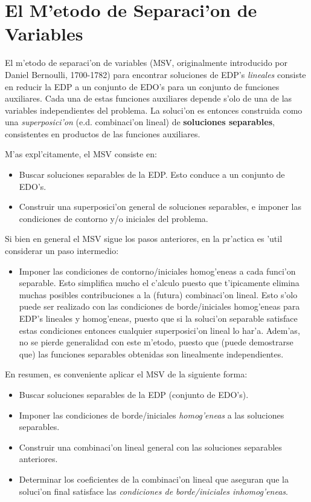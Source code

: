 \chapter{El M'etodo de Separaci'on de Variables}

El m'etodo de separaci'on de variables (MSV, originalmente introducido por Daniel Bernoulli, 1700-1782) para encontrar soluciones de EDP's \textit{lineales} consiste en reducir la EDP a un conjunto de EDO's para un conjunto de funciones auxiliares. Cada una de estas funciones auxiliares depende s'olo de una de las variables independientes del problema. La soluci'on es entonces construida como una \textit{superposici'on} (e.d. combinaci'on lineal) de \textbf{soluciones separables}, consistentes en productos de las funciones auxiliares.

M'as expl'citamente, el MSV consiste en:
\begin{itemize}
\item Buscar soluciones separables de la EDP. Esto conduce a un conjunto de EDO's.
\item Construir una superposici'on general de soluciones separables, e imponer las condiciones de contorno y/o iniciales del problema.
\end{itemize}

Si bien en general el MSV sigue los pasos anteriores, en la pr'actica es 'util considerar un paso intermedio:
\begin{itemize}
\item Imponer las condiciones de contorno/iniciales homog'eneas a cada funci'on separable. Esto simplifica mucho el c'alculo puesto que t'ipicamente elimina muchas posibles contribuciones a la (futura) combinaci'on lineal. Esto s'olo puede ser realizado con las condiciones de borde/iniciales homog'eneas para EDP's lineales y homog'eneas, puesto que si la soluci'on separable satisface estas condiciones entonces cualquier superposici'on lineal lo har'a. Adem'as, no se pierde generalidad con este m'etodo, puesto que (puede demostrarse que) las funciones separables obtenidas son linealmente independientes.
\end{itemize}

En resumen, es conveniente aplicar el MSV de la siguiente forma:
\begin{itemize}
\item Buscar soluciones separables de la EDP (conjunto de EDO's).
\item Imponer las condiciones de borde/iniciales \textit{homog'eneas} a las soluciones separables.
\item Construir una combinaci'on lineal general con las soluciones separables anteriores.
\item Determinar los coeficientes de la combinaci'on lineal que aseguran que la soluci'on final satisface las \textit{condiciones de borde/iniciales inhomog'eneas}.
\end{itemize}



